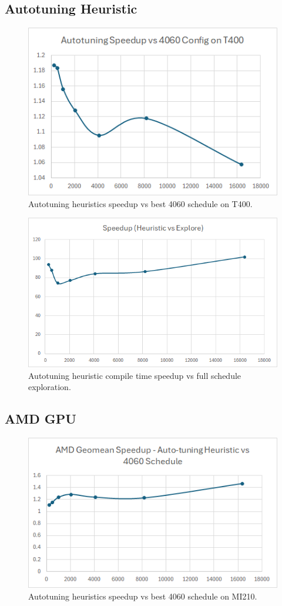 \subsection{Autotuning Heuristic}
\begin{figure}[htb]
  \centering
  \includegraphics[width=0.75\linewidth]{figures/AutotuningSpeedupvs4060Sched_T400.png}
  \caption{Autotuning heuristics speedup vs best 4060 schedule on T400.}
  \label{Fig:AutotuningSpeedupvs4060Sched_T400}
\end{figure}

\begin{figure}[htb]
  \centering
  \includegraphics[width=0.75\linewidth]{figures/HeuristicVsFullExplore_Speedup.png}
  \caption{Autotuning heuristic compile time speedup vs full schedule exploration.}
  \label{Fig:HeuristicVsFullExplore_Speedup}
\end{figure}

\subsection{AMD GPU}
\begin{figure}[htb]
  \centering
  \includegraphics[width=0.75\linewidth]{figures/AMD_MI210_ATHeuristicVs4060Sched_speedup.png}
  \caption{Autotuning heuristics speedup vs best 4060 schedule on MI210.}
  \label{Fig:AMD_MI210_ATHeuristicVs4060Sched_speedup}
\end{figure}

